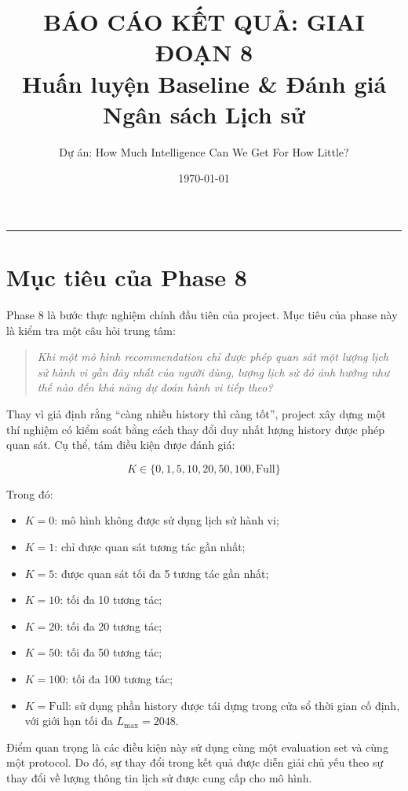 \documentclass[12pt,a4paper]{article}
\title{
    \textbf{BÁO CÁO KẾT QUẢ: GIAI ĐOẠN 8}\\
    \large{Huấn luyện Baseline \& Đánh giá Ngân sách Lịch sử}
}
\author{Dự án: How Much Intelligence Can We Get For How Little?}
\date{\today}
\begin{document}
\maketitle
\hrule
\vspace{15pt}

\section{Mục tiêu của Phase 8}

Phase 8 là bước thực nghiệm chính đầu tiên của project. Mục tiêu của phase này là kiểm tra một câu hỏi trung tâm:

\begin{quote}
\textit{
Khi một mô hình recommendation chỉ được phép quan sát một lượng lịch sử hành vi gần đây nhất của người dùng, lượng lịch sử đó ảnh hưởng như thế nào đến khả năng dự đoán hành vi tiếp theo?
}
\end{quote}

Thay vì giả định rằng ``càng nhiều history thì càng tốt'', project xây dựng một thí nghiệm có kiểm soát bằng cách thay đổi duy nhất lượng history được phép quan sát. Cụ thể, tám điều kiện được đánh giá:

\[
K \in \{0, 1, 5, 10, 20, 50, 100, \mathrm{Full}\}
\]

Trong đó:
\begin{itemize}[noitemsep]
    \item $K=0$: mô hình không được sử dụng lịch sử hành vi;
    \item $K=1$: chỉ được quan sát tương tác gần nhất;
    \item $K=5$: được quan sát tối đa 5 tương tác gần nhất;
    \item $K=10$: tối đa 10 tương tác;
    \item $K=20$: tối đa 20 tương tác;
    \item $K=50$: tối đa 50 tương tác;
    \item $K=100$: tối đa 100 tương tác;
    \item $K=\mathrm{Full}$: sử dụng phần history được tái dựng trong cửa sổ thời gian cố định, với giới hạn tối đa $L_{\max}=2048$.
\end{itemize}

Điểm quan trọng là các điều kiện này sử dụng cùng một evaluation set và cùng một protocol. Do đó, sự thay đổi trong kết quả được diễn giải chủ yếu theo sự thay đổi về lượng thông tin lịch sử được cung cấp cho mô hình.
\end{document}
